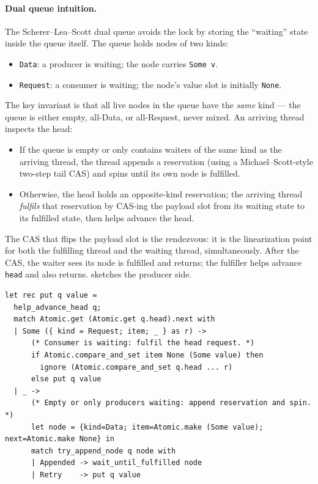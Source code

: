 \documentclass[11pt,a4paper]{article}
\begin{document}
\paragraph{Dual queue intuition.}
The Scherer--Lea--Scott dual queue avoids the lock by storing the
``waiting'' state inside the queue itself. The queue holds nodes of two
kinds:
\begin{itemize}[leftmargin=1.4em,itemsep=0.2em]
  \item \texttt{Data}: a producer is waiting; the node carries
    \texttt{Some v}.
  \item \texttt{Request}: a consumer is waiting; the node's value slot
    is initially \texttt{None}.
\end{itemize}
The key invariant is that all live nodes in the queue have the
\emph{same} kind --- the queue is either empty, all-Data, or all-Request,
never mixed. An arriving thread inspects the head:
\begin{itemize}[leftmargin=1.4em,itemsep=0.2em]
  \item If the queue is empty or only contains waiters of the same kind
    as the arriving thread, the thread appends a reservation (using a
    Michael--Scott-style two-step tail CAS) and spins until its own node
    is fulfilled.
  \item Otherwise, the head holds an opposite-kind reservation; the
    arriving thread \emph{fulfils} that reservation by CAS-ing the
    payload slot from its waiting state to its fulfilled state, then
    helps advance the head.
\end{itemize}
The CAS that flips the payload slot is the rendezvous: it is the
linearization point for both the fulfilling thread and the waiting
thread, simultaneously. After the CAS, the waiter sees its node is
fulfilled and returns; the fulfiller helps advance \texttt{head} and
also returns.  sketches the producer side.

\begin{lstlisting}[language=caml,caption={Producer (\texttt{put}) sketch.},label={lst:put}]
let rec put q value =
  help_advance_head q;
  match Atomic.get (Atomic.get q.head).next with
  | Some ({ kind = Request; item; _ } as r) ->
      (* Consumer is waiting: fulfil the head request. *)
      if Atomic.compare_and_set item None (Some value) then
        ignore (Atomic.compare_and_set q.head ... r)
      else put q value
  | _ ->
      (* Empty or only producers waiting: append reservation and spin. *)
      let node = {kind=Data; item=Atomic.make (Some value); next=Atomic.make None} in
      match try_append_node q node with
      | Appended -> wait_until_fulfilled node
      | Retry    -> put q value
\end{lstlisting}
\end{document}
